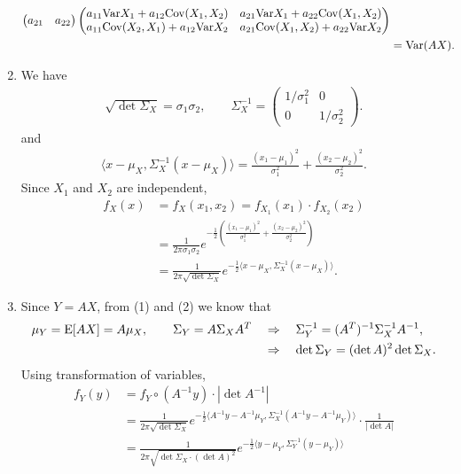 \begin{enumerate}
\begin{align*}
\begin{pmatrix}
	a_{21} & a_{22}
	\end{pmatrix}\begin{pmatrix}
	a_{11}\mathrm{Var}X_1 + a_{12}\mathrm{Cov}(X_1, X_2) & a_{21}\mathrm{Var}X_1 + a_{22}\mathrm{Cov}(X_1, X_2) \\
	a_{11}\mathrm{Cov}(X_2, X_1) + a_{12}\mathrm{Var}X_2 & a_{21}\mathrm{Cov}(X_1, X_2) + a_{22}\mathrm{Var}X_2
	\end{pmatrix} \\
	& = \mathrm{Var}(AX).
	\end{align*}
	\item We have
	\begin{align*}
	\sqrt{\det \Sigma_X} = \sigma_1\sigma_2, \qquad \Sigma_X^{-1} = \begin{pmatrix}
	1/\sigma_1^2 & 0 \\
	0 & 1/\sigma_2^2
	\end{pmatrix}.
	\end{align*}
	and
	\begin{align*}
	\langle x - \mu_X, \Sigma_X^{-1}(x - \mu_X)\rangle = \frac{(x_1 - \mu_1)^2}{\sigma_1^2} + \frac{(x_2 - \mu_2)^2}{\sigma_2^2}.
	\end{align*}
	Since $X_1$ and $X_2$ are independent, 
	\begin{align*}
	f_X(x) & = f_X(x_1, x_2) = f_{X_1}(x_1)\cdot f_{X_2}(x_2) \\
	& = \frac{1}{2\pi \sigma_1\sigma_2} e^{-\frac{1}{2}\left(\frac{(x_1 - \mu_1)^2}{\sigma_1^2} + \frac{(x_2-\mu_2)^2}{\sigma_2^2} \right)} \\
	& = \frac{1}{2\pi \sqrt{\det \Sigma_X}} e^{-\frac{1}{2}\langle x-\mu_X, \Sigma_X^{-1}(x-\mu_X)\rangle}.
	\end{align*}
	\item Since $Y = AX$, from (1) and (2) we know that
	\begin{align*}
	\mu_Y = \mathrm{E}[AX] = A\mu_X, \qquad \Sigma_Y = A\Sigma_X A^T \quad & \Rightarrow\quad \Sigma_Y^{-1} = (A^T)^{-1}\Sigma_X^{-1}A^{-1}, \\
	& \Rightarrow\quad \det\Sigma_Y = (\det A)^2\det\Sigma_X.
	\end{align*}
	Using transformation of variables,
	\begin{align*}
	f_Y(y) & = f_Y\circ (A^{-1}y) \cdot |\det A^{-1}| \\
	& = \frac{1}{2\pi \sqrt{\det\Sigma_X}} e^{-\frac{1}{2}\langle A^{-1}y - A^{-1}\mu_Y, \Sigma_X^{-1}(A^{-1}y - A^{-1}\mu_Y)\rangle} \cdot \frac{1}{|\det A|} \\
	& = \frac{1}{2\pi \sqrt{\det \Sigma_X \cdot (\det A)^2}} e^{-\frac{1}{2}\langle y - \mu_Y, \Sigma_Y^{-1}(y - \mu_Y)\rangle} \\

\end{align*}
\end{enumerate}
